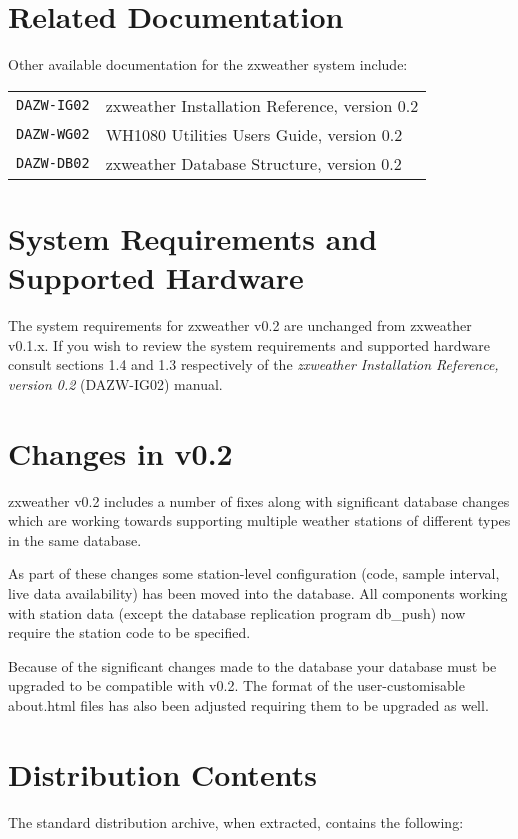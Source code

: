 \documentclass[a4paper,10pt,draft]{book}
\begin{document}
\section{Related Documentation}
Other available documentation for the zxweather system include:

\begin{tabular}{l l}
\verb|DAZW-IG02| & zxweather Installation Reference, version 0.2\\
\verb|DAZW-WG02| & WH1080 Utilities Users Guide, version 0.2 \\
\verb|DAZW-DB02| & zxweather Database Structure, version 0.2 \\
\end{tabular}

\section{System Requirements and Supported Hardware}
The system requirements for zxweather v0.2 are unchanged from zxweather v0.1.x. If you wish to review the system requirements and supported hardware consult sections 1.4 and 1.3 respectively of the \emph{zxweather Installation Reference, version 0.2} (DAZW-IG02) manual.

\section{Changes in v0.2}
zxweather v0.2 includes a number of fixes along with significant database changes which are working towards supporting multiple weather stations of different types in the same database.

As part of these changes some station-level configuration (code, sample interval, live data availability) has been moved into the database. All components working with station data (except the database replication program db\_push) now require the station code to be specified.

Because of the significant changes made to the database your database must be upgraded to be compatible with v0.2. The format of the user-customisable about.html files has also been adjusted requiring them to be upgraded as well.

\section{Distribution Contents}
The standard distribution archive, when extracted, contains the following:
\end{document}
